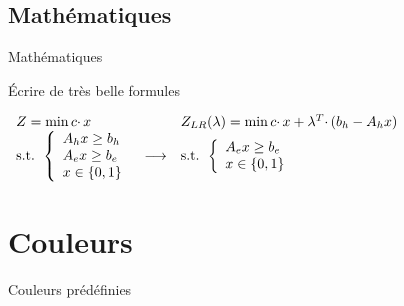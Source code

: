 \documentclass[french]{beamer}
\begin{document}
  \subsection{Mathématiques}
  
  \begin{frame}{Mathématiques}
    \begin{block}{}
      Écrire de très belle formules
        
        $\begin{array}{l c l}
          Z = \min c\cdotp x & & Z_{LR}(\lambda) = \min c\cdotp x + \lambda^T\cdotp(b_h - A_hx)\\
          \mbox{s.t. }
          \left\{
            \begin{array}{l}
              A_hx \geq b_h\\
              A_ex \geq b_e\\
              x \in \{0, 1\}
            \end{array}
          \right.
          & \longrightarrow
          & \mbox{s.t. }
          \left\{
            \begin{array}{l}
              A_ex \geq b_e\\
              x \in \{0, 1\}
            \end{array}
          \right.
        \end{array}$
    \end{block}
  \end{frame}
  
  \section{Couleurs}
  
  \begin{frame}[standout]
    Couleurs prédéfinies
  \end{frame}
  
\end{document}
